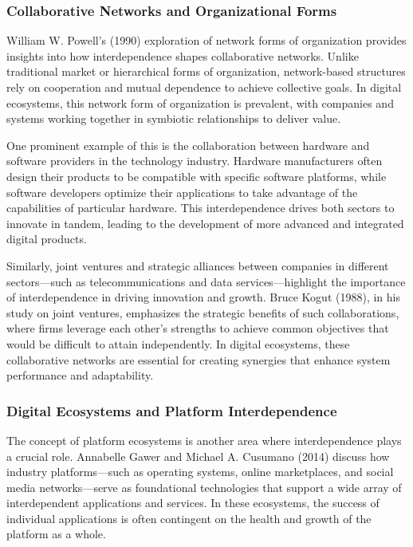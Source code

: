 \documentclass[12pt,twoside]{article}
\begin{document}
\subsubsection{Collaborative Networks and Organizational Forms}

William W. Powell’s (1990) exploration of network forms of organization provides insights into how interdependence shapes collaborative networks. Unlike traditional market or hierarchical forms of organization, network-based structures rely on cooperation and mutual dependence to achieve collective goals. In digital ecosystems, this network form of organization is prevalent, with companies and systems working together in symbiotic relationships to deliver value.

One prominent example of this is the collaboration between hardware and software providers in the technology industry. Hardware manufacturers often design their products to be compatible with specific software platforms, while software developers optimize their applications to take advantage of the capabilities of particular hardware. This interdependence drives both sectors to innovate in tandem, leading to the development of more advanced and integrated digital products.

Similarly, joint ventures and strategic alliances between companies in different sectors—such as telecommunications and data services—highlight the importance of interdependence in driving innovation and growth. Bruce Kogut (1988), in his study on joint ventures, emphasizes the strategic benefits of such collaborations, where firms leverage each other’s strengths to achieve common objectives that would be difficult to attain independently. In digital ecosystems, these collaborative networks are essential for creating synergies that enhance system performance and adaptability.

\subsubsection{Digital Ecosystems and Platform Interdependence}

The concept of platform ecosystems is another area where interdependence plays a crucial role. Annabelle Gawer and Michael A. Cusumano (2014) discuss how industry platforms—such as operating systems, online marketplaces, and social media networks—serve as foundational technologies that support a wide array of interdependent applications and services. In these ecosystems, the success of individual applications is often contingent on the health and growth of the platform as a whole.
\end{document}
